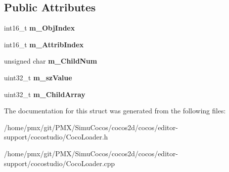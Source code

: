 \subsection*{Public Attributes}
\begin{DoxyCompactItemize}
\item 
\mbox{\label{structcocostudio_1_1stExpCocoNode_a95ae3ee52161d41a80778d2e28af4fe4}} 
int16\+\_\+t {\bfseries m\+\_\+\+Obj\+Index}
\item 
\mbox{\label{structcocostudio_1_1stExpCocoNode_a8bbb46d6979d9bd2ac78501f93b36852}} 
int16\+\_\+t {\bfseries m\+\_\+\+Attrib\+Index}
\item 
\mbox{\label{structcocostudio_1_1stExpCocoNode_a58f928eda5d8828015c9ae672cf3e860}} 
unsigned char {\bfseries m\+\_\+\+Child\+Num}
\item 
\mbox{\label{structcocostudio_1_1stExpCocoNode_a281809e32fb2430caa3d34d546099fdb}} 
uint32\+\_\+t {\bfseries m\+\_\+sz\+Value}
\item 
\mbox{\label{structcocostudio_1_1stExpCocoNode_abb6ce89af83c090b3a51ec82e15609af}} 
uint32\+\_\+t {\bfseries m\+\_\+\+Child\+Array}
\end{DoxyCompactItemize}


The documentation for this struct was generated from the following files\+:\begin{DoxyCompactItemize}
\item 
/home/pmx/git/\+P\+M\+X/\+Simu\+Cocos/cocos2d/cocos/editor-\/support/cocostudio/Coco\+Loader.\+h\item 
/home/pmx/git/\+P\+M\+X/\+Simu\+Cocos/cocos2d/cocos/editor-\/support/cocostudio/Coco\+Loader.\+cpp\end{DoxyCompactItemize}
